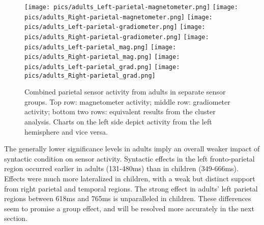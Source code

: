 \begin{figure}[h]
\begin{center}
\texttt{[image: pics/adults\_Left-parietal-magnetometer.png]}
\texttt{[image: pics/adults\_Right-parietal-magnetometer.png]}
\texttt{[image: pics/adults\_Left-parietal-gradiometer.png]}
\texttt{[image: pics/adults\_Right-parietal-gradiometer.png]}
\texttt{[image: pics/adults\_Left-parietal\_mag.png]}
\texttt{[image: pics/adults\_Right-parietal\_mag.png]}
\texttt{[image: pics/adults\_Left-parietal\_grad.png]}
\texttt{[image: pics/adults\_Right-parietal\_grad.png]}
\caption{\label{4.2.activity.adults.parietal} Combined parietal sensor activity from adults in separate sensor groups. Top row: magnetometer activity; middle row: gradiometer activity; bottom two rows: equivalent results from the cluster analysis. Charts on the left side depict activity from the left hemisphere and vice versa.}
\end{center}
\end{figure}


The generally lower significance levels in adults imply an overall weaker impact of syntactic condition on sensor activity.
Syntactic effects in the left fronto-parietal region occurred earlier in adults (131-480ms) than in children (349-666ms).
Effects were much more lateralized in children, with a weak but distinct support from right parietal and temporal regions.
The strong effect in adults' left parietal regions between 618ms and 765ms is unparalleled in children.
These differences seem to promise a group effect, and will be resolved more accurately in the next section.


